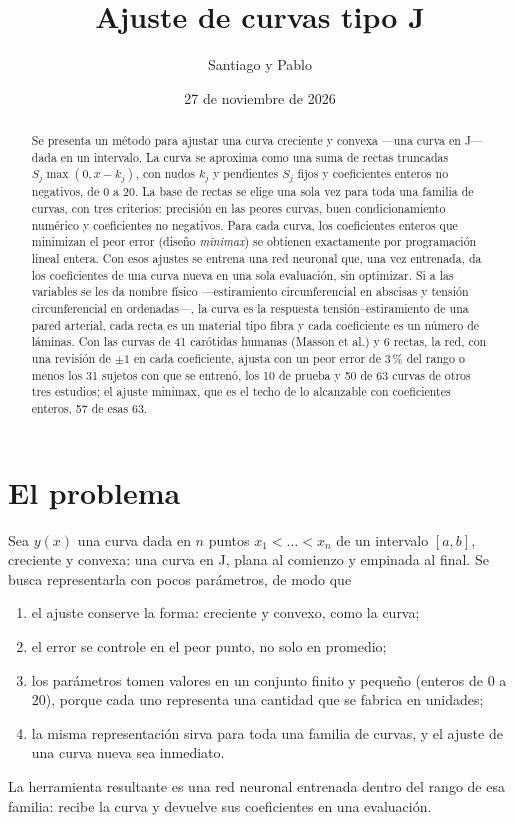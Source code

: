 
\title{\textbf{Ajuste de curvas tipo J}}
\author{Santiago y Pablo}
\date{27 de noviembre de 2026}

\maketitle

\begin{abstract}
\noindent Se presenta un método para ajustar una curva creciente y convexa ---una curva en J--- dada en un intervalo. La curva se aproxima como una suma de rectas truncadas $S_j\max(0,x-k_j)$, con nudos $k_j$ y pendientes $S_j$ fijos y coeficientes enteros no negativos, de 0 a 20. La base de rectas se elige una sola vez para toda una familia de curvas, con tres criterios: precisión en las peores curvas, buen condicionamiento numérico y coeficientes no negativos. Para cada curva, los coeficientes enteros que minimizan el peor error (diseño \emph{minimax}) se obtienen exactamente por programación lineal entera. Con esos ajustes se entrena una red neuronal que, una vez entrenada, da los coeficientes de una curva nueva en una sola evaluación, sin optimizar. Si a las variables se les da nombre físico ---estiramiento circunferencial en abscisas y tensión circunferencial en ordenadas---, la curva es la respuesta tensión--estiramiento de una pared arterial, cada recta es un material tipo fibra y cada coeficiente es un número de láminas. Con las curvas de 41 carótidas humanas (Masson et al.) y 6 rectas, la red, con una revisión de $\pm1$ en cada coeficiente, ajusta con un peor error de 3\,\% del rango o menos los 31 sujetos con que se entrenó, los 10 de prueba y 50 de 63 curvas de otros tres estudios; el ajuste minimax, que es el techo de lo alcanzable con coeficientes enteros, 57 de esas 63.
\end{abstract}

\section{El problema}
Sea $y(x)$ una curva dada en $n$ puntos $x_1<\dots<x_n$ de un intervalo $[a,b]$, creciente y convexa: una curva en J, plana al comienzo y empinada al final. Se busca representarla con pocos parámetros, de modo que
\begin{enumerate}[label=(\roman*)]
\item el ajuste conserve la forma: creciente y convexo, como la curva;
\item el error se controle en el peor punto, no solo en promedio;
\item los parámetros tomen valores en un conjunto finito y pequeño (enteros de 0 a 20), porque cada uno representa una cantidad que se fabrica en unidades;
\item la misma representación sirva para toda una familia de curvas, y el ajuste de una curva nueva sea inmediato.
\end{enumerate}
La herramienta resultante es una red neuronal entrenada dentro del rango de esa familia: recibe la curva y devuelve sus coeficientes en una evaluación.

